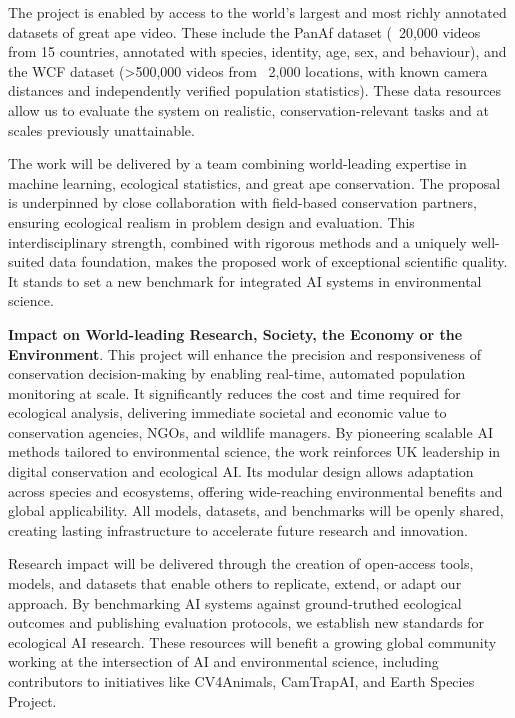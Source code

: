 The project is enabled by access to the world’s largest and most richly annotated datasets of great ape video. These include the PanAf dataset (~20,000 videos from 15 countries, annotated with species, identity, age, sex, and behaviour), and the WCF dataset (>500,000 videos from ~2,000 locations, with known camera distances and independently verified population statistics). These data resources allow us to evaluate the system on realistic, conservation-relevant tasks and at scales previously unattainable.

The work will be delivered by a team combining world-leading expertise in machine learning, ecological statistics, and great ape conservation. The proposal is underpinned by close collaboration with field-based conservation partners, ensuring ecological realism in problem design and evaluation. This interdisciplinary strength, combined with rigorous methods and a uniquely well-suited data foundation, makes the proposed work of exceptional scientific quality. It stands to set a new benchmark for integrated AI systems in environmental science.


\textbf{Impact on World-leading Research, Society, the Economy or the Environment}. This project will enhance the precision and responsiveness of conservation decision-making by enabling real-time, automated population monitoring at scale. It significantly reduces the cost and time required for ecological analysis, delivering immediate societal and economic value to conservation agencies, NGOs, and wildlife managers. By pioneering scalable AI methods tailored to environmental science, the work reinforces UK leadership in digital conservation and ecological AI. Its modular design allows adaptation across species and ecosystems, offering wide-reaching environmental benefits and global applicability. All models, datasets, and benchmarks will be openly shared, creating lasting infrastructure to accelerate future research and innovation.


Research impact will be delivered through the creation of open-access tools, models, and datasets that enable others to replicate, extend, or adapt our approach. By benchmarking AI systems against ground-truthed ecological outcomes and publishing evaluation protocols, we establish new standards for ecological AI research. These resources will benefit a growing global community working at the intersection of AI and environmental science, including contributors to initiatives like CV4Animals, CamTrapAI, and Earth Species Project.

